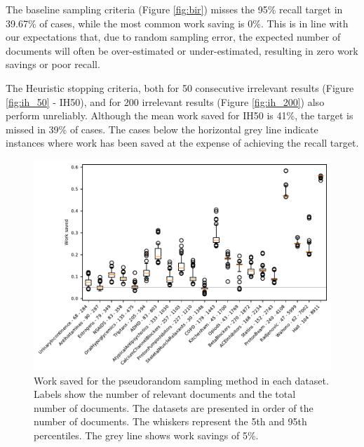 \documentclass{bmcart}
\begin{document}
	The baseline sampling criteria (Figure \ref{fig:bir}) misses the 95\% recall target in 39.67\% of cases, while the most common work saving is 0\%. This is in line with our expectations that, due to random sampling error, the expected number of documents will often be over-estimated or under-estimated, resulting in zero work savings or poor recall.
	
	The Heuristic stopping criteria, both for 50 consecutive irrelevant results (Figure \ref{fig:ih_50} - IH50), and for 200 irrelevant results (Figure \ref{fig:ih_200}) also perform unreliably. Although the mean work saved for IH50 is 41\%, the target is missed in 39\% of cases. The cases below the horizontal grey line indicate instances where work has been saved at the expense of achieving the recall target.
	
	\begin{figure}
		\includegraphics[width=0.9\linewidth]{../images/wss_nrs}
		\caption{Work saved for the pseudorandom sampling method in each dataset. Labels show the number of relevant documents and the total number of documents. The datasets are presented in order of the number of documents. The whiskers represent the 5th and 95th percentiles. The grey line shows work savings of 5\%. }
		\label{wss}
	\end{figure}
	
\end{document}
